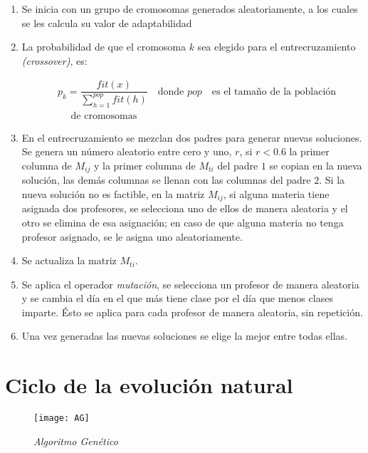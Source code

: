 \begin{enumerate}
\item Se inicia con un grupo de cromosomas generados aleatoriamente, a los cuales se les calcula su valor de adaptabilidad

\item La probabilidad de que el cromosoma $k$ sea elegido para el entrecruzamiento \textit{(crossover)}, es:
  
\begin{equation*}
\begin{split}
&p_{k} = \dfrac{fit(x)}{\displaystyle \sum_{h = 1}^{pop} fit(h)} \,\,\,\, \text{ donde } pop \,\,\,\, \text{ es el tamaño de la población}\\
&\quad \text{ de cromosomas }
\end{split}
\end{equation*}


\item En el entrecruzamiento se mezclan dos padres para generar nuevas soluciones. Se genera un número aleatorio entre cero y uno, $r$, si $r < 0.6$  la primer columna de $M_{ij}$ y la primer columna de $M_{ti}$ del padre $1$ se copian en la nueva solución, las demás columnas se llenan con las columnas del padre $2$. Si la nueva solución no es factible, en la matriz $M_{ij}$, si alguna materia tiene asignada dos profesores, se selecciona uno de ellos de manera aleatoria y el otro se elimina de esa asignación; en caso de que alguna materia no tenga profesor asignado, se le asigna uno aleatoriamente.

\item Se actualiza la matriz $M_{ti}$.

\item Se aplica el operador \textit{mutación}, se selecciona un profesor de manera aleatoria y se cambia el día en el que más tiene clase por el día que menos clases imparte. Ésto se aplica para cada profesor de manera aleatoria, sin repetición.

\item Una vez generadas las nuevas soluciones se elige la mejor entre todas ellas.
\end{enumerate}

\section{Ciclo de la evolución natural}

\begin{figure}[H]
\centering
\texttt{[image: AG]} %
\caption{\textit{Algoritmo Genético}}
\end{figure}

